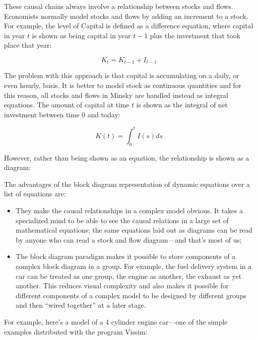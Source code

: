 These causal chains always involve a relationship between stocks and
flows. Economists normally model stocks and flows by adding an
increment to a stock. For example, the level of Capital is defined as
a difference equation, where capital in year $t$ is shown as being 
capital in year $t-1$ plus the investment that took place that year:

\begin{displaymath}
K_t=K_{t-1}+I_{t-1}
\end{displaymath}

The problem with this approach is that capital is accumulating on a daily, 
or even hourly, basis. It is better to model stock as continuous quantities
and for this reason, all stocks and flows in Minsky are handled instead 
as integral equations. The amount of capital at time $t$ is shown as 
the integral of net investment between time 0 and today:

\begin{displaymath}
K(t)=\int_0^t I(s)ds
\end{displaymath}

However, rather than being shown as an equation, the relationship is shown as a diagram:

\begin{center}
\end{center}

The advantages of the block diagram representation of dynamic equations
over a list of equations are:
\begin{itemize}
\item    They make the causal relationships in a complex model
  obvious. It takes a specialized mind to be able to see the causal
  relations in a large set of mathematical equations; the same
  equations laid out as diagrams can be read by anyone who can read
  a stock and flow diagram---and that's most of us;
\item The block diagram paradigm makes it possible to store components of
  a complex block diagram in a group. For example, the fuel delivery
  system in a car can be treated as one group, the engine as another,
  the exhaust as yet another. This reduces visual complexity and also
  makes it possible for different components of a complex model to be
  designed by different groups and then ``wired together'' at a later
  stage.
\end{itemize}

For example, here's a model of a 4 cylinder engine car---one of the
simple examples distributed with the program Vissim:

